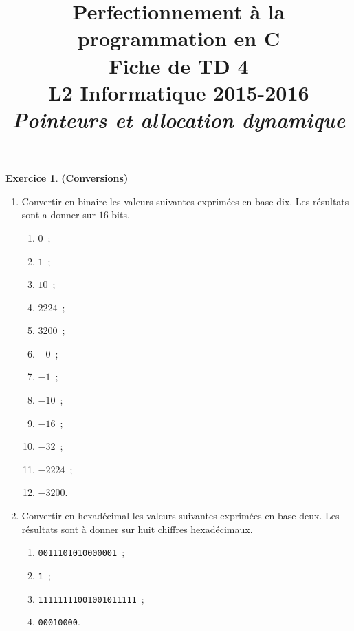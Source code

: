 \documentclass[12pt]{article}
\date{}
\title{{\bf Perfectionnement à la programmation en {\sf C}} \\
    Fiche de TD 4 \\
    {\small L2 Informatique 2015-2016} \\
    {\it \small Pointeurs et allocation dynamique}}
\theoremstyle{definition}
\newtheorem{Exercice}{Exercice}
\begin{document}
\maketitle

\begin{Exercice} {\bf (Conversions)}\smallskip

\begin{enumerate}
    \item Convertir en binaire les valeurs suivantes exprimées en base 
    dix. Les résultats sont a donner sur $16$ bits.
    \begin{multicols}{3}
    \begin{enumerate}
        \item $0$~;
        \item $1$~;
        \item $10$~;
        \item $2224$~;
        \item $3200$~;
        \item $-0$~;
        \item $-1$~;
        \item $-10$~;
        \item $-16$~;
        \item $-32$~;
        \item $-2224$~;
        \item $-3200$.
    \end{enumerate}
    \end{multicols}
    \smallskip
    
    \item Convertir en hexadécimal les valeurs suivantes exprimées en
    base deux. Les résultats sont à donner sur huit chiffres hexadécimaux.
    \begin{multicols}{2}
    \begin{enumerate}
        \item {\tt 0011101010000001}~;
        \item {\tt 1}~;
        \item {\tt 11111111001001011111}~;
        \item {\tt 00010000}.
    \end{enumerate}
    \end{multicols}
    \smallskip
    

\end{enumerate}
\end{Exercice}
\end{document}

